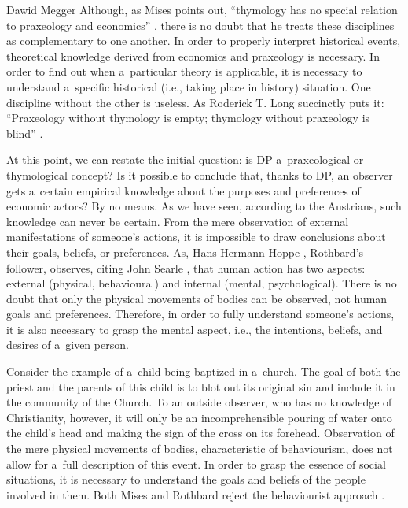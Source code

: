 \begin{artengenv}{Dawid Megger}
Although, as Mises points out, ``thymology has no special relation to praxeology and economics'' 
\parencite[][p.271]{mises_theory_2007}, %
 there is no doubt that he treats these disciplines as complementary to one another. In order to properly interpret historical events, theoretical knowledge derived from economics and praxeology is necessary. In order to find out when a~particular theory is applicable, it is necessary to understand a~specific historical (i.e., taking place in history) situation. One discipline without the other is useless. As Roderick T. Long succinctly puts it: ``Praxeology without thymology is empty; thymology without praxeology is blind'' 
\parencite[][p.50]{long_wittgenstein_2008}.%




At this point, we can restate the initial question: is DP a~praxeological or thymological concept? Is it possible to conclude that, thanks to DP, an observer gets a~certain empirical knowledge about the purposes and preferences of economic actors? By no means. As we have seen, according to the Austrians, such knowledge can never be certain. From the mere observation of external manifestations of someone's actions, it is impossible to draw conclusions about their goals, beliefs, or preferences. As, Hans-Hermann Hoppe 
\parencite*[][]{hoppe_note_2005}, %
 Rothbard's follower, observes, citing John Searle 
\parencite*[][pp.57–58]{searle_minds_1984}, %
 that human action has two aspects: external (physical, behavioural) and internal (mental, psychological). There is no doubt that only the physical movements of bodies can be observed, not human goals and preferences. Therefore, in order to fully understand someone's actions, it is also necessary to grasp the mental aspect, i.e., the intentions, beliefs, and desires of a~given person.



Consider the example of a~child being baptized in a~church. The goal of both the priest and the parents of this child is to blot out its original sin and include it in the community of the Church. To an outside observer, who has no knowledge of Christianity, however, it will only be an incomprehensible pouring of water onto the child's head and making the sign of the cross on its forehead. Observation of the mere physical movements of bodies, characteristic of behaviourism, does not allow for a~full description of this event. In order to grasp the essence of social situations, it is necessary to understand the goals and beliefs of the people involved in them. Both Mises and Rothbard reject the behaviourist approach 
\parencites[cf.][]{mises_theory_2007}[][]{rothbard_present_2011}.%





\end{artengenv}
